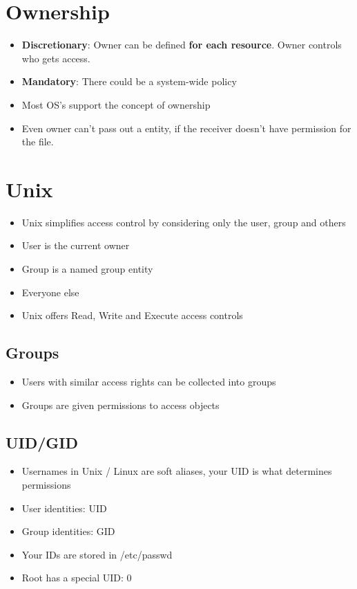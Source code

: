 \documentclass{article}
\begin{document}
\section{Ownership}
\begin{itemize}
  \item \textbf{Discretionary}: Owner can be defined \textbf{for each resource}. Owner controls who gets access.
  \item \textbf{Mandatory}: There could be a system-wide policy 
  \item Most OS’s support the concept of ownership
  \item Even owner can't pass out a entity, if the receiver doesn't have permission for the file.
\end{itemize}

\section{Unix}
\begin{itemize}
  \item Unix simplifies access control by considering only the user, group and others 
  \item User is the current owner 
  \item Group is a named group entity 
  \item Everyone else 
  \item Unix offers Read, Write and Execute access controls
\end{itemize}

\subsection{Groups}
\begin{itemize}
  \item Users with similar access rights can be collected into groups 
  \item Groups are given permissions to access objects
\end{itemize}

\subsection{UID/GID}
\begin{itemize}
  \item Usernames in Unix / Linux are soft aliases, your UID is what determines permissions 
  \item User identities: UID 
  \item Group identities: GID 
  \item Your IDs are stored in /etc/passwd 
  \item Root has a special UID: 0
\end{itemize}
\end{document}
